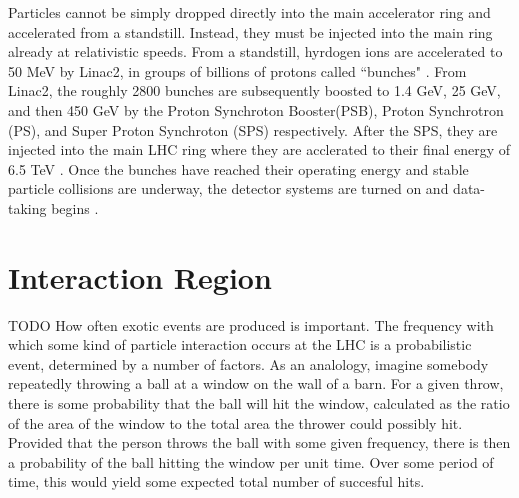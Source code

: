     Particles cannot be simply dropped directly into the main accelerator ring and accelerated from a standstill.
    Instead, they must be injected into the main ring already at relativistic speeds.
    From a standstill, hyrdogen ions are accelerated to 50 MeV by Linac2, in groups of billions of protons called ``bunches" \cite{lhc_run2}.
    From Linac2, the roughly 2800 bunches are subsequently boosted to 1.4 GeV, 25 GeV, and then 450 GeV by the Proton Synchroton Booster(PSB), Proton Synchrotron (PS), and Super Proton Synchroton (SPS) respectively.
    After the SPS, they are injected into the main LHC ring where they are acclerated to their final energy of 6.5 TeV \cite{lhc_machine}.
    Once the bunches have reached their operating energy and stable particle collisions are underway, the detector systems are turned on and data-taking begins \cite{data_quality}.
    


\section{Interaction Region} TODO
    How often exotic events are produced is important.
    The frequency with which some kind of particle interaction occurs at the LHC is a probabilistic event, determined by a number of factors.
    As an analology, imagine somebody repeatedly throwing a ball at a window on the wall of a barn.
    For a given throw, there is some probability that the ball will hit the window, calculated as the ratio of the area of the window to the total area the thrower could possibly hit.
    Provided that the person throws the ball with some given frequency, there is then a probability of the ball hitting the window per unit time.
    Over some period of time, this would yield some expected total number of succesful hits.

